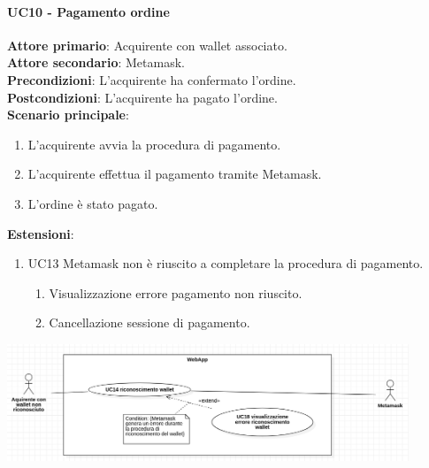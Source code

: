 \documentclass[a4paper, 12pt]{article}
\begin{document}
\paragraph{UC10 - Pagamento ordine}
\textbf{Attore primario}: Acquirente con wallet associato.\\
\textbf{Attore secondario}: Metamask.\\
\textbf{Precondizioni}: L'acquirente ha confermato l'ordine.\\
\textbf{Postcondizioni}: L'acquirente ha pagato l'ordine.\\
\textbf{Scenario principale}:
\begin{enumerate}
    \item L'acquirente avvia la procedura di pagamento.
    \item L'acquirente effettua il pagamento tramite Metamask.
    \item L'ordine è stato pagato.
\end{enumerate}
\textbf{Estensioni}:
\begin{enumerate}
    \item UC13 Metamask non è riuscito a completare la procedura di pagamento.
    \begin{enumerate}
        \item Visualizzazione errore pagamento non riuscito.
        \item Cancellazione sessione di pagamento.
    \end{enumerate}
\end{enumerate}

\includegraphics[width=0.9\textwidth]{UseCase_webapp1}
\end{document}
